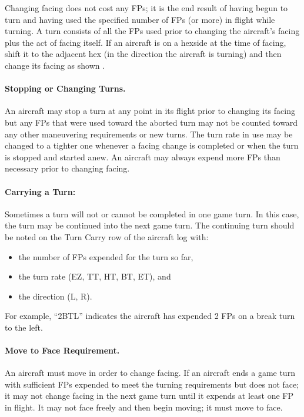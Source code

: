 Changing facing does not cost any FPs; it is the end result of having begun to turn and having used the specified number of FPs (or more) in flight while turning. A turn consists of all the FPs used prior to changing the aircraft's facing plus the act of facing itself. If an aircraft is on a hexside at the time of facing, shift it to the adjacent hex (in the direction the aircraft is turning) and then change its facing as shown . 



\paragraph{Stopping or Changing Turns.} An aircraft may stop a turn at any point in its flight prior to changing its facing but any FPs that were used toward the aborted turn may not be counted toward any other maneuvering requirements or new turns. The turn rate in use may be changed to a tighter one whenever a facing change is completed or when the turn is stopped and started anew. An aircraft may always expend more FPs than necessary prior to changing facing.

\paragraph{Carrying a Turn:} Sometimes a turn will not or cannot be completed in one game turn. In this case, the turn may be continued into the next game turn. The continuing turn should be noted on the Turn Carry row of the aircraft log with:

\begin{itemize}

    \item the number of FPs expended for the turn so far,

    \item the turn rate (EZ, TT, HT, BT, ET), and

    \item the direction (L, R).

\end{itemize}

For example, “2BTL” indicates the aircraft has expended 2 FPs on a break turn to the left.

\paragraph{Move to Face Requirement.} An aircraft must move in order to change facing. If an aircraft ends a game turn with sufficient FPs expended to meet the turning requirements but does not face; it may not change facing in the next game turn until it expends at least one FP in flight.  It may not face freely and then begin moving; it must move to face.

